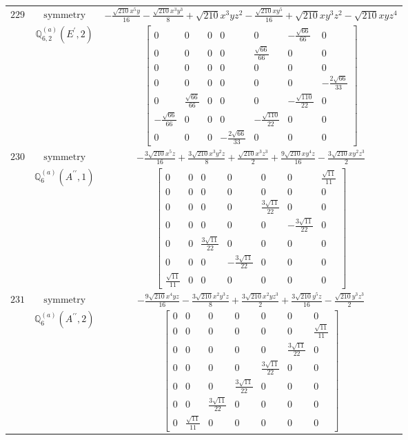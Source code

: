 \documentclass[fleqn,8pt,landscape]{jsarticle}
\begin{document}
\begin{longtable}{ccc}
$ 229 $ & $ \text{symmetry} $ & $ - \frac{\sqrt{210} x^{5} y}{16} - \frac{\sqrt{210} x^{3} y^{3}}{8} + \sqrt{210} x^{3} y z^{2} - \frac{\sqrt{210} x y^{5}}{16} + \sqrt{210} x y^{3} z^{2} - \sqrt{210} x y z^{4} $ \\
$  $ & $ \mathbb{Q}_{6,2}^{(a)}(E^{\prime},2) $ & $ \begin{bmatrix} 0 & 0 & 0 & 0 & 0 & - \frac{\sqrt{66}}{66} & 0 \\ 0 & 0 & 0 & 0 & \frac{\sqrt{66}}{66} & 0 & 0 \\ 0 & 0 & 0 & 0 & 0 & 0 & 0 \\ 0 & 0 & 0 & 0 & 0 & 0 & - \frac{2 \sqrt{66}}{33} \\ 0 & \frac{\sqrt{66}}{66} & 0 & 0 & 0 & - \frac{\sqrt{110}}{22} & 0 \\ - \frac{\sqrt{66}}{66} & 0 & 0 & 0 & - \frac{\sqrt{110}}{22} & 0 & 0 \\ 0 & 0 & 0 & - \frac{2 \sqrt{66}}{33} & 0 & 0 & 0 \end{bmatrix} $ \\ \hline
$ 230 $ & $ \text{symmetry} $ & $ - \frac{3 \sqrt{210} x^{5} z}{16} + \frac{3 \sqrt{210} x^{3} y^{2} z}{8} + \frac{\sqrt{210} x^{3} z^{3}}{2} + \frac{9 \sqrt{210} x y^{4} z}{16} - \frac{3 \sqrt{210} x y^{2} z^{3}}{2} $ \\
$  $ & $ \mathbb{Q}_{6}^{(a)}(A^{\prime\prime},1) $ & $ \begin{bmatrix} 0 & 0 & 0 & 0 & 0 & 0 & \frac{\sqrt{11}}{11} \\ 0 & 0 & 0 & 0 & 0 & 0 & 0 \\ 0 & 0 & 0 & 0 & \frac{3 \sqrt{11}}{22} & 0 & 0 \\ 0 & 0 & 0 & 0 & 0 & - \frac{3 \sqrt{11}}{22} & 0 \\ 0 & 0 & \frac{3 \sqrt{11}}{22} & 0 & 0 & 0 & 0 \\ 0 & 0 & 0 & - \frac{3 \sqrt{11}}{22} & 0 & 0 & 0 \\ \frac{\sqrt{11}}{11} & 0 & 0 & 0 & 0 & 0 & 0 \end{bmatrix} $ \\ \hline
$ 231 $ & $ \text{symmetry} $ & $ - \frac{9 \sqrt{210} x^{4} y z}{16} - \frac{3 \sqrt{210} x^{2} y^{3} z}{8} + \frac{3 \sqrt{210} x^{2} y z^{3}}{2} + \frac{3 \sqrt{210} y^{5} z}{16} - \frac{\sqrt{210} y^{3} z^{3}}{2} $ \\
$  $ & $ \mathbb{Q}_{6}^{(a)}(A^{\prime\prime},2) $ & $ \begin{bmatrix} 0 & 0 & 0 & 0 & 0 & 0 & 0 \\ 0 & 0 & 0 & 0 & 0 & 0 & \frac{\sqrt{11}}{11} \\ 0 & 0 & 0 & 0 & 0 & \frac{3 \sqrt{11}}{22} & 0 \\ 0 & 0 & 0 & 0 & \frac{3 \sqrt{11}}{22} & 0 & 0 \\ 0 & 0 & 0 & \frac{3 \sqrt{11}}{22} & 0 & 0 & 0 \\ 0 & 0 & \frac{3 \sqrt{11}}{22} & 0 & 0 & 0 & 0 \\ 0 & \frac{\sqrt{11}}{11} & 0 & 0 & 0 & 0 & 0 \end{bmatrix} $ \\ \hline

\end{longtable}
\end{document}
